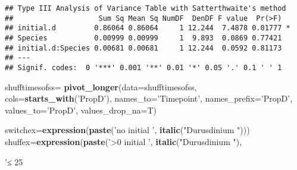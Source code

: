 \documentclass[]{article}
\newenvironment{Shaded}{\begin{snugshade}}{\end{snugshade}}
\newcommand{\DataTypeTok}[1]{\textcolor[rgb]{0.13,0.29,0.53}{#1}}
\newcommand{\KeywordTok}[1]{\textcolor[rgb]{0.13,0.29,0.53}{\textbf{#1}}}
\newcommand{\NormalTok}[1]{#1}
\newcommand{\StringTok}[1]{\textcolor[rgb]{0.31,0.60,0.02}{#1}}
\begin{document}
\begin{verbatim}
## Type III Analysis of Variance Table with Satterthwaite's method
##                    Sum Sq Mean Sq NumDF  DenDF F value  Pr(>F)  
## initial.d         0.86064 0.86064     1 12.244  7.4878 0.01777 *
## Species           0.00999 0.00999     1  9.893  0.0869 0.77421  
## initial.d:Species 0.00681 0.00681     1 12.244  0.0592 0.81173  
## ---
## Signif. codes:  0 '***' 0.001 '**' 0.01 '*' 0.05 '.' 0.1 ' ' 1
\end{verbatim}

\begin{Shaded}
\begin{Highlighting}[]
\NormalTok{shufftimesofss=}\StringTok{ }\KeywordTok{pivot_longer}\NormalTok{(}\DataTypeTok{data=}\NormalTok{shufftimesofss, }\DataTypeTok{cols=}\KeywordTok{starts_with}\NormalTok{(}\StringTok{'PropD'}\NormalTok{),}
               \DataTypeTok{names_to=}\StringTok{'Timepoint'}\NormalTok{, }\DataTypeTok{names_prefix=}\StringTok{'PropD'}\NormalTok{, }\DataTypeTok{values_to=}\StringTok{'PropD'}\NormalTok{,}
               \DataTypeTok{values_drop_na=}\NormalTok{T)}

\NormalTok{switchex=}\KeywordTok{expression}\NormalTok{(}\KeywordTok{paste}\NormalTok{(}\StringTok{'no initial '}\NormalTok{, }\KeywordTok{italic}\NormalTok{(}\StringTok{"Durusdinium "}\NormalTok{)))}
\NormalTok{shuffex=}\KeywordTok{expression}\NormalTok{(}\KeywordTok{paste}\NormalTok{(}\StringTok{'>0 initial '}\NormalTok{, }\KeywordTok{italic}\NormalTok{(}\StringTok{"Durusdinium "}\NormalTok{), }\StringTok{'≤ 25%'}\NormalTok{))}

}
\end{Highlighting}
\end{Shaded}
\end{document}
